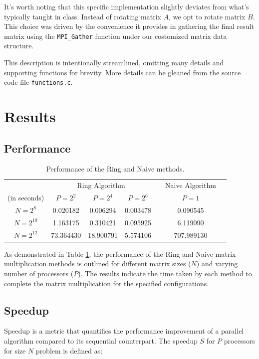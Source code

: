 \documentclass[12pt,a4paper]{article}
\begin{document}
It's worth noting that this specific implementation slightly deviates from what's typically taught in class. 
Instead of rotating matrix $A$, we opt to rotate matrix $B$. 
This choice was driven by the convenience it provides in gathering the final result matrix 
 using the \texttt{MPI\_Gather} function under our costomized matrix data structure.

This description is intentionally streamlined, 
omitting many details and supporting functions for brevity. 
More details can be gleaned from the source code file \texttt{functions.c}.

\section{Results}
\subsection{Performance}

\begin{table}[ht]
    \centering
    \begin{tabular}{ccccccc}
        \toprule
        & \multicolumn{3}{c}{Ring Algorithm} & \multicolumn{1}{c}{} & \multicolumn{1}{c}{Naive Algorithm} \\
        \cmidrule(lr){2-4} \cmidrule(lr){6-6}
        (in seconds) & \( P = 2^2 \) & \( P = 2^4 \) & \( P = 2^6 \) & & \( P = 1 \) \\
        \midrule
        \( N = 2^8 \)  & 0.020182 & 0.006294 & 0.003478 & & 0.090545 \\
        \( N = 2^{10} \) & 1.163175 & 0.310421 & 0.095925 & & 6.119090 \\
        \( N = 2^{12} \) & 73.364430 & 18.900791 & 5.574106 & & 707.989130 \\
        \bottomrule
    \end{tabular}
    \caption{Performance of the Ring and Naive methods.}
    \label{tab:results}
\end{table}

As demonstrated in Table \ref{tab:results}, 
the performance of the Ring and Naive matrix multiplication methods is outlined for different matrix sizes (\(N\)) 
 and varying number of processors (\(P\)). 
The results indicate the time taken by each method to complete the matrix multiplication 
 for the specified configurations.

\subsection{Speedup}
Speedup is a metric that quantifies the performance improvement of a parallel algorithm compared to its sequential counterpart. 
The speedup \( S \) for \( P \) processors for size $N$ problem is defined as:
\end{document}
